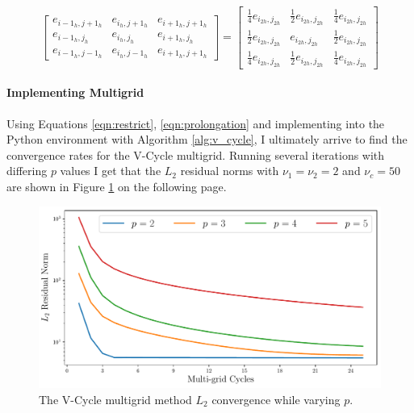         \begin{equation}
            \begin{bmatrix}
                e_{i-1_{h},j+1_{h}} & e_{i_{h},j+1_{h}} & e_{i+1_{h},j+1_{h}}\\
                e_{i-1_{h},j_{h}} & e_{i_{h},j_{h}} & e_{i+1_{h},j_{h}}\\
                e_{i-1_{h},j-1_{h}} & e_{i_{h},j-1_{h}} & e_{i+1_{h},j+1_{h}}
            \end{bmatrix} = \begin{bmatrix}
                \frac{1}{4}e_{i_{2h},j_{2h}} & \frac{1}{2}e_{i_{2h},j_{2h}} & \frac{1}{4}e_{i_{2h},j_{2h}}\\
                \frac{1}{2}e_{i_{2h},j_{2h}} & e_{i_{2h},j_{2h}} & \frac{1}{2}e_{i_{2h},j_{2h}}\\
                \frac{1}{4}e_{i_{2h},j_{2h}} & \frac{1}{2}e_{i_{2h},j_{2h}} & \frac{1}{4}e_{i_{2h},j_{2h}}
            \end{bmatrix}
            \label{eqn:prolongation}
        \end{equation}

    
    \paragraph{Implementing Multigrid}
    Using Equations \ref{eqn:restrict}, \ref{eqn:prolongation} and implementing into the Python environment with Algorithm \ref{alg:v_cycle}, I ultimately arrive to find the convergence rates for the V-Cycle multigrid. Running several iterations with differing $p$ values I get that the $L_2$ residual norms with $\nu_1=\nu_2=2$ and $\nu_c=50$ are shown in Figure \ref{fig:vcyc_l2_err} on the following page.

    \pagebreak
    \begin{figure}[h]
        \centering
        \includegraphics[width = 0.9\linewidth]{tasks/figs/vcyc_l2_err.pdf}
        \caption[V-Cycle $L_2$ Convergence]{The V-Cycle multigrid method $L_2$ convergence while varying $p$.}
        \label{fig:vcyc_l2_err}
    \end{figure}


